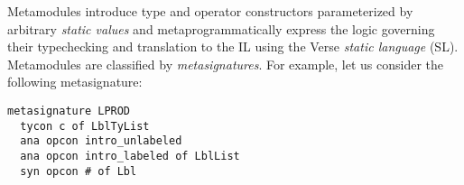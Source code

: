 Metamodules introduce type and operator constructors parameterized by arbitrary \emph{static values} and metaprogrammatically express the logic governing their typechecking and  translation to the IL using the Verse \emph{static language} (SL). Metamodules are classified by \emph{metasignatures}. For example, let us consider the following metasignature:
\begin{lstlisting}
metasignature LPROD
  tycon c of LblTyList
  ana opcon intro_unlabeled
  ana opcon intro_labeled of LblList
  syn opcon # of Lbl
\end{lstlisting}



